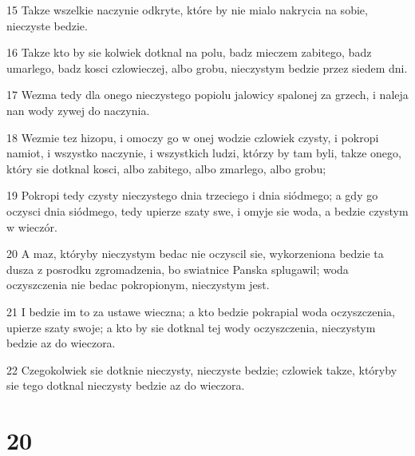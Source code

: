 \par 15 Takze wszelkie naczynie odkryte, które by nie mialo nakrycia na sobie, nieczyste bedzie.
\par 16 Takze kto by sie kolwiek dotknal na polu, badz mieczem zabitego, badz umarlego, badz kosci czlowieczej, albo grobu, nieczystym bedzie przez siedem dni.
\par 17 Wezma tedy dla onego nieczystego popiolu jalowicy spalonej za grzech, i naleja nan wody zywej do naczynia.
\par 18 Wezmie tez hizopu, i omoczy go w onej wodzie czlowiek czysty, i pokropi namiot, i wszystko naczynie, i wszystkich ludzi, którzy by tam byli, takze onego, który sie dotknal kosci, albo zabitego, albo zmarlego, albo grobu;
\par 19 Pokropi tedy czysty nieczystego dnia trzeciego i dnia siódmego; a gdy go oczysci dnia siódmego, tedy upierze szaty swe, i omyje sie woda, a bedzie czystym w wieczór.
\par 20 A maz, któryby nieczystym bedac nie oczyscil sie, wykorzeniona bedzie ta dusza z posrodku zgromadzenia, bo swiatnice Panska splugawil; woda oczyszczenia nie bedac pokropionym, nieczystym jest.
\par 21 I bedzie im to za ustawe wieczna; a kto bedzie pokrapial woda oczyszczenia, upierze szaty swoje; a kto by sie dotknal tej wody oczyszczenia, nieczystym bedzie az do wieczora.
\par 22 Czegokolwiek sie dotknie nieczysty, nieczyste bedzie; czlowiek takze, któryby sie tego dotknal nieczysty bedzie az do wieczora.

\chapter{20}

